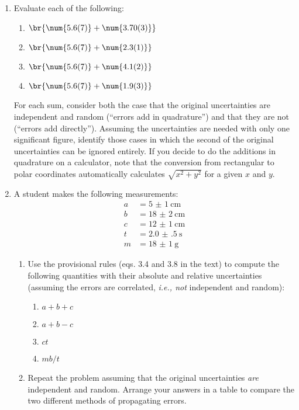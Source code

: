 \documentclass[nobib,nofonts,nols,nohyper]{tufte-handout}
\begin{document}
\begin{enumerate}
	\item{} Evaluate each of the following:
	\begin{enumerate}
		\item \( \br{\num{5.6(7)} + \num{3.70(3)}} \)
		
		\item \( \br{\num{5.6(7)} + \num{2.3(1)}} \)
		
		\item \( \br{\num{5.6(7)} + \num{4.1(2)}} \)
		
		\item \( \br{\num{5.6(7)} + \num{1.9(3)}} \)
	\end{enumerate}
	For each sum, consider both the case that the original uncertainties are independent and random (``errors add in quadrature'') and that they are not (``errors add directly''). 
	Assuming the uncertainties are needed with only one significant figure, identify those cases in which the second of the original uncertainties can be ignored entirely. 
	If you decide to do the additions in quadrature on a calculator, note that the conversion from rectangular to polar coordinates automatically calculates \( \sqrt{x^2 + y^2} \) for a given \( x \) and \( y \). 
	
	\item A student makes the following measurements:
		\begin{align*}
			a &= \qty{5(1)}{\cm} \\
			b &= \qty{18(2)}{\cm} \\
			c &= \qty{12(1)}{\cm} \\
			t &= \qty{2.0(5)}{\s} \\
			m &= \qty{18(1)}{\g} 
		\end{align*}
	\begin{enumerate}
		\item Use the provisional rules (eqs. 3.4 and 3.8 in the text) to compute the following quantities with their absolute and relative uncertainties (assuming the errors are correlated, \emph{i.e., not} independent and random):
		\begin{enumerate}
			\item \( a + b + c \)
			\item \( a + b - c \)
			\item \( ct \)
			\item \( mb/t \)
		\end{enumerate}
	
		\item Repeat the problem assuming that the original uncertainties \emph{are} independent and random. 
		Arrange your answers in a table to compare the two different methods of propagating errors. 
	\end{enumerate}
	

\end{enumerate}
\end{document}
